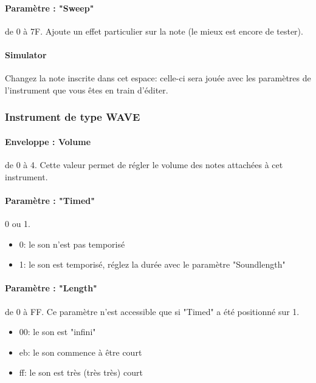 \documentclass[12pt,a4paper]{article}
\begin{document}
    \paragraph{Paramètre : "Sweep"} de 0 à 7F.
    Ajoute un effet particulier sur la note (le mieux est encore de tester).

    \paragraph{Simulator} Changez la note inscrite dans cet espace:
            celle-ci sera jouée avec les paramètres de l'instrument que vous êtes en train d'éditer.

    \subsubsection{Instrument de type WAVE}


    \paragraph{Enveloppe : Volume} de 0 à 4.
    Cette valeur permet de régler le volume des notes attachées à cet instrument.

    \paragraph{Paramètre : "Timed"} 0 ou 1.
    \medskip

    \begin{itemize}
            \item{0: le son n'est pas temporisé}
            \item{1: le son est temporisé, réglez la durée avec le paramètre "Soundlength"}
        \end{itemize}

    \paragraph{Paramètre : "Length"} de 0 à FF.
    Ce paramètre n'est accessible que si "Timed" a été positionné sur 1.
    \medskip

    \begin{itemize}
            \item{00: le son est "infini"}
            \item{eb: le son commence à être court}
            \item{ff: le son est très (très très) court}
        \end{itemize}
\end{document}
